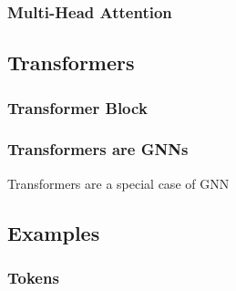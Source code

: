 \subsubsection{Multi-Head Attention}

\subsection{Transformers}
\begin{notes}

\end{notes}

\subsubsection{Transformer Block}
\begin{notes}
    
\end{notes}

\subsubsection{Transformers are GNNs}
\begin{summary} Transformers are a special case of GNN
\end{summary}

\subsection{Examples}
\subsubsection{Tokens}
\begin{example}
    
\end{example}

